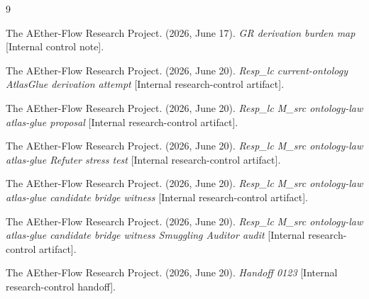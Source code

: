 \documentclass[11pt]{article}
\begin{document}
\begin{thebibliography}{9}

The AEther-Flow Research Project. (2026, June 17). \emph{GR derivation burden
map} [Internal control note].

The AEther-Flow Research Project. (2026, June 20). \emph{Resp\_lc
current-ontology AtlasGlue derivation attempt} [Internal research-control
artifact].

The AEther-Flow Research Project. (2026, June 20). \emph{Resp\_lc M\_src
ontology-law atlas-glue proposal} [Internal research-control artifact].

The AEther-Flow Research Project. (2026, June 20). \emph{Resp\_lc M\_src
ontology-law atlas-glue Refuter stress test} [Internal research-control
artifact].

The AEther-Flow Research Project. (2026, June 20). \emph{Resp\_lc M\_src
ontology-law atlas-glue candidate bridge witness} [Internal research-control
artifact].

The AEther-Flow Research Project. (2026, June 20). \emph{Resp\_lc M\_src
ontology-law atlas-glue candidate bridge witness Smuggling Auditor audit}
[Internal research-control artifact].

The AEther-Flow Research Project. (2026, June 20). \emph{Handoff 0123}
[Internal research-control handoff].

\end{thebibliography}
\end{document}
